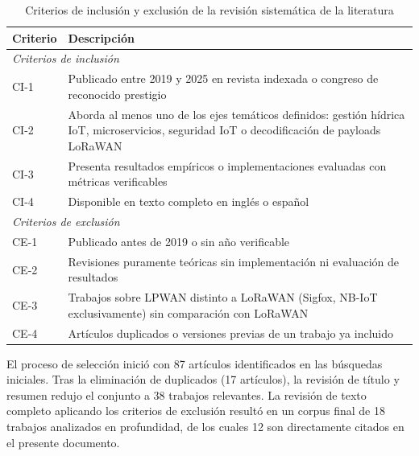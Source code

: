 \documentclass[12pt,a4paper,oneside]{report}
\begin{document}
\begin{table}[H]
\caption{Criterios de inclusión y exclusión de la revisión sistemática de la literatura}
\label{tab:prisma}
\centering
\begin{tabularx}{\textwidth}{lX}
\toprule
\textbf{Criterio} & \textbf{Descripción} \\
\midrule
\multicolumn{2}{l}{\textit{Criterios de inclusión}} \\
\midrule
CI-1 & Publicado entre 2019 y 2025 en revista indexada o congreso de reconocido prestigio \\
CI-2 & Aborda al menos uno de los ejes temáticos definidos: gestión hídrica IoT, microservicios, seguridad IoT o decodificación de payloads LoRaWAN \\
CI-3 & Presenta resultados empíricos o implementaciones evaluadas con métricas verificables \\
CI-4 & Disponible en texto completo en inglés o español \\
\midrule
\multicolumn{2}{l}{\textit{Criterios de exclusión}} \\
\midrule
CE-1 & Publicado antes de 2019 o sin año verificable \\
CE-2 & Revisiones puramente teóricas sin implementación ni evaluación de resultados \\
CE-3 & Trabajos sobre LPWAN distinto a LoRaWAN (Sigfox, NB-IoT exclusivamente) sin comparación con LoRaWAN \\
CE-4 & Artículos duplicados o versiones previas de un trabajo ya incluido \\
\bottomrule
\end{tabularx}
\end{table}

El proceso de selección inició con 87 artículos identificados en las búsquedas iniciales. Tras la eliminación de duplicados (17 artículos), la revisión de título y resumen redujo el conjunto a 38 trabajos relevantes. La revisión de texto completo aplicando los criterios de exclusión resultó en un corpus final de 18 trabajos analizados en profundidad, de los cuales 12 son directamente citados en el presente documento.
\end{document}
